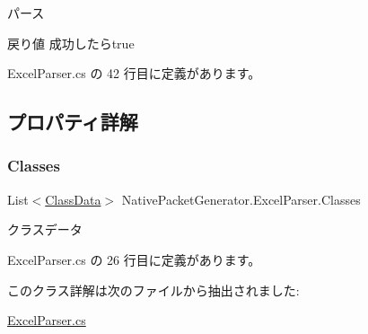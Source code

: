 パース 

\begin{DoxyReturn}{戻り値}
成功したらtrue
\end{DoxyReturn}


 Excel\+Parser.\+cs の 42 行目に定義があります。



\subsection{プロパティ詳解}
\mbox{\label{classNativePacketGenerator_1_1ExcelParser_a23b18866f851a758ddf54ac9f077c3e0}} 
\subsubsection{\texorpdfstring{Classes}{Classes}}
{\footnotesize\ttfamily List$<$\mbox{\hyperlink{classNativePacketGenerator_1_1ClassData}{Class\+Data}}$>$ Native\+Packet\+Generator.\+Excel\+Parser.\+Classes\hspace{0.3cm}{\ttfamily [get]}}



クラスデータ 



 Excel\+Parser.\+cs の 26 行目に定義があります。



このクラス詳解は次のファイルから抽出されました\+:\begin{DoxyCompactItemize}
\item 
\mbox{\hyperlink{ExcelParser_8cs}{Excel\+Parser.\+cs}}\end{DoxyCompactItemize}
